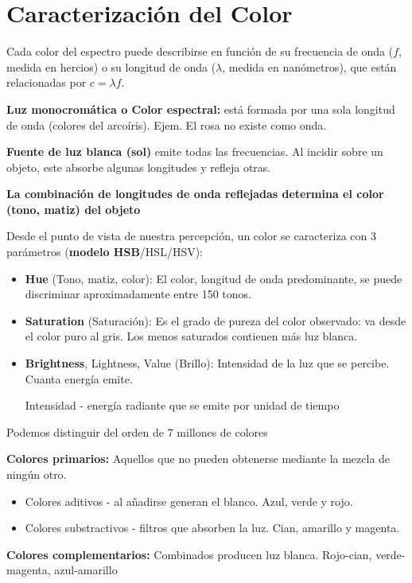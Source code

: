 \section{Caracterización del Color}
Cada color del espectro puede describirse en función de su frecuencia de onda ($f$, medida en hercios) o su longitud de onda ($\lambda$, medida en nanómetros), que están relacionadas por $c = \lambda f$.

\textbf{Luz monocromática o Color espectral:} está formada por una sola longitud de onda (colores del arcoíris). Ejem. El rosa no existe como onda.

\textbf{Fuente de luz blanca (sol)} emite todas las frecuencias. Al incidir sobre un objeto, este absorbe algunas longitudes y refleja otras. 

\textbf{La combinación de longitudes de onda reflejadas determina el color (tono, matiz) del objeto}

Desde el punto de vista de nuestra percepción, un color se caracteriza con 3 parámetros (\textbf{modelo HSB}/HSL/HSV):
\begin{itemize}
    \item \textbf{Hue} (Tono, matiz, color): El color, longitud de onda predominante, se puede discriminar aproximadamente entre 150 tonos.
    \item \textbf{Saturation} (Saturación): Es el grado de pureza del color observado: va desde el color puro al gris. Los menos saturados contienen más luz blanca.
    \item \textbf{Brightness}, Lightness, Value (Brillo): Intensidad de la luz que se percibe. Cuanta energía emite.
    
    Intensidad - energía radiante que se emite por unidad de tiempo
\end{itemize}

Podemos distinguir del orden de 7 millones de colores

\textbf{Colores primarios:} Aquellos que no pueden obtenerse mediante la mezcla de ningún otro.
\begin{itemize}
    \item Colores aditivos - al añadirse generan el blanco. Azul, verde y rojo.
    \item Colores substractivos - filtros que absorben la luz. Cian, amarillo y magenta.
\end{itemize}

\textbf{Colores complementarios:} Combinados producen luz blanca. Rojo-cian, verde-magenta, azul-amarillo

